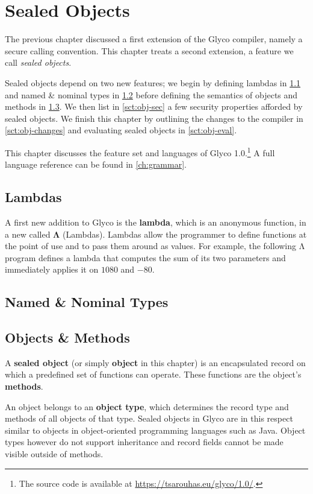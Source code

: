 \documentclass[main.tex]{subfiles}
\begin{document}
\onlyinsubfile{\mainmatter{}}

\chapter{Sealed Objects}
The previous chapter discussed a first extension of the Glyco compiler, namely a secure calling convention. This chapter treats a second extension, a feature we call \emph{sealed objects}.

Sealed objects depend on two new features; we begin by defining lambdas in \cref{sct:lambda} and named \& nominal types in \cref{sct:named-ty} before defining the semantics of objects and methods in \cref{sct:obj-meth}. We then list in \cref{sct:obj-sec} a few security properties afforded by sealed objects. We finish this chapter by outlining the changes to the compiler in \cref{sct:obj-changes} and evaluating sealed objects in \cref{sct:obj-eval}.

This chapter discusses the feature set and languages of Glyco 1.0.\footnote{The source code is available at \url{https://tsarouhas.eu/glyco/1.0/}.} A full language reference can be found in \cref{ch:grammar}.

\section{Lambdas} \label{sct:lambda}
A first new addition to Glyco is the \textbf{lambda}, which is an anonymous function, in a new  called \textbf{Λ} (Lambdas). Lambdas allow the programmer to define functions at the point of use and to pass them around as values. For example, the following Λ program defines a lambda that computes the sum of its two parameters and immediately applies it on $1080$ and $-80$.

\section{Named \& Nominal Types} \label{sct:named-ty}

\section{Objects \& Methods} \label{sct:obj-meth}
A \textbf{sealed object} (or simply \textbf{object} in this chapter) is an encapsulated record on which a predefined set of functions can operate. These functions are the object's \textbf{methods}.

An object belongs to an \textbf{object type}, which determines the record type and methods of all objects of that type. Sealed objects in Glyco are in this respect similar to objects in object-oriented programming languages such as Java. Object types however do not support inheritance and record fields cannot be made visible outside of methods.
\end{document}
